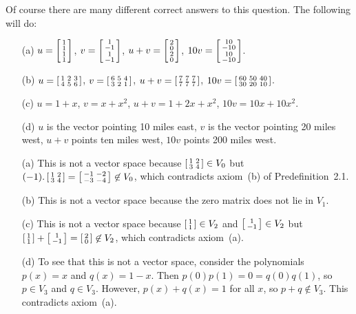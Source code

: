 
 Of course there are many different correct answers to this
 question. The following will do:
 \begin{itemize}
  \item[(a)] $u=\left[\begin{smallmatrix} 1\\1\\1\\1\end{smallmatrix}\right]$,
             $v=\left[\begin{smallmatrix} 1\\-1\\1\\-1\end{smallmatrix}\right]$,
             $u+v=\left[\begin{smallmatrix} 2\\0\\2\\0\end{smallmatrix}\right]$,
             $10v=\left[\begin{smallmatrix} 10\\-10\\10\\-10\end{smallmatrix}\right]$.
  \item[(b)] $u=\left[\begin{smallmatrix} 1&2&3\\4&5&6\end{smallmatrix}\right]$,
             $v=\left[\begin{smallmatrix} 6&5&4\\3&2&1\end{smallmatrix}\right]$,
             $u+v=\left[\begin{smallmatrix} 7&7&7\\7&7&7\end{smallmatrix}\right]$,
             $10v=\left[\begin{smallmatrix} 60&50&40\\30&20&10\end{smallmatrix}\right]$.
  \item[(c)] $u=1+x$, $v=x+x^2$, $u+v=1+2x+x^2$, $10v=10x+10x^2$.
  \item[(d)] $u$ is the vector pointing 10 miles east, $v$
   is the vector pointing 20 miles west, $u+v$ points ten
   miles west, $10v$ points 200 miles west.
 \end{itemize}
\EndDeferredSolution

 \begin{itemize}
 \item[(a)] This is not a vector space because
  $\left[\begin{smallmatrix} 1&2\\3&4\end{smallmatrix}\right]\in V_0$ but
  $(-1).\left[\begin{smallmatrix} 1&2\\3&4\end{smallmatrix}\right]=\left[\begin{smallmatrix} -1&-2\\-3&-4\end{smallmatrix}\right]\not\in V_0$,
  which contradicts axiom~(b) of Predefinition~2.1.
 \item[(b)] This is not a vector space because the zero matrix does
  not lie in $V_1$.
 \item[(c)] This is not a vector space because
  $\left[\begin{smallmatrix} 1\\1\end{smallmatrix}\right]\in V_2$ and $\left[\begin{smallmatrix} 1\\-1\end{smallmatrix}\right]\in V_2$
  but $\left[\begin{smallmatrix} 1\\1\end{smallmatrix}\right]+\left[\begin{smallmatrix} 1\\-1\end{smallmatrix}\right]=\left[\begin{smallmatrix} 2\\0\end{smallmatrix}\right]\not\in V_2$,
  which contradicts axiom~(a).
 \item[(d)] To see that this is not a vector space, consider
  the polynomials $p(x)=x$ and $q(x)=1-x$.  Then
  $p(0)p(1)=0=q(0)q(1)$, so $p\in V_3$ and $q\in V_3$.
  However, $p(x)+q(x)=1$ for all $x$, so $p+q\not\in V_3$.
  This contradicts axiom~(a).
 \end{itemize}
\EndDeferredSolution

